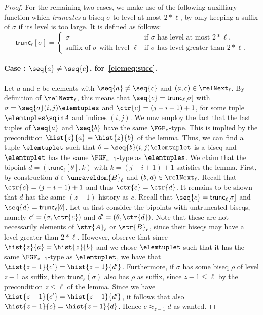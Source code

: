 \begin{proof}
  For the remaining two cases, we make use of the following auxilliary function which \emph{truncates} a biseq $\sigma$ to level at most $2 * \ell$, by only keeping a suffix of $\sigma$ if its level is too large.
  It is defined as follows:
  \begin{displaymath}
    \mathsf{trunc}_{\ell}[\sigma] =
    \begin{cases}
      \sigma & \text{if $\sigma$ has level at most $2 * \ell$,} \\
      \text{suffix of $\sigma$ with level $\ell$} & \text{if $\sigma$ has level greater than $2 * \ell$.}
    \end{cases}
  \end{displaymath}

  \paragraph{Case : $\seq{a} \ne \seq{c}$, for~\ref{elemeq:succ}.}
  Let $a$ and $c$ be elements with $\seq{a} \ne \seq{c}$ and $(a,c) \in \relNext_{\ell}$.
  By definition of $\relNext_{\ell}$, this means that $\seq{c} = \mathsf{trunc}_{\ell}[\sigma]$ with $\sigma = \seq{a}(i,j)\elemtuples$ and $\ctr{c} = (j-i+1)+1$, for some tuple $\elemtuples \sqin A$ and indices $(i,j)$.
  We now employ the fact that the last tuples of $\seq{a}$ and $\seq{b}$ have the same $\FGF_{z}$-type.
  This is implied by the precondition $\hist{z}{a} = \hist{z}{b}$ of the lemma.
  Thus, we can find a tuple $\elemtuplet$ such that $\theta = \seq{b} (i,j) \elemtuplet$ is a biseq and $\elemtuplet$ has the same $\FGF_{z{-}1}$-type as $\elemtuples$.
  We claim that the bipoint $d = (\mathsf{trunc}_{\ell}[\theta], k)$ with $k = (j-i+1)+1$ satisfies the lemma.
  First, by construction $d \in \unraveldom{B}_{\ell}$ and $(b,d) \in \relNext_{\ell}$.
  Recall that $\ctr{c} = (j-i+1)+1$ and thus $\ctr{c} = \ctr{d}$.
  It remains to be shown that $d$ has the same $(z-1)$-history as $c$.
  Recall that $\seq{c} = \mathsf{trunc}_{\ell}[\sigma]$ and $\seq{d} = \mathsf{trunc}_{\ell}[\theta]$.
  Let us first consider the bipoints with untruncated biseqs, namely $c' = (\sigma, \ctr{c})$ and $d' = (\theta, \ctr{d})$.
  Note that these are not necessarily elements of $\str{A}_{\ell}$ or $\str{B}_{\ell}$, since their biseqs may have a level greater than $2 * \ell$.
  However, observe that since $\hist{z}{a} = \hist{z}{b}$ and we chose $\elemtuplet$ such that it has the same $\FGF_{z-1}$-type as $\elemtuplet$, we have that $\hist{z-1}{c'} = \hist{z-1}{d'}$.
  Furthermore, if $\sigma$ has some biseq $\rho$ of level $z-1$ as suffix, then $\mathsf{trunc}_{\ell}(\sigma)$ also has $\rho$ as suffix, since $z-1 \le \ell$ by the precondition $z \le \ell$ of the lemma.
  Since we have $\hist{z-1}{c'} = \hist{z-1}{d'}$, it follows that also $\hist{z-1}{c} = \hist{z-1}{d}$.
  Hence $c \approx_{z-1} d$ as wanted.


\end{proof}
